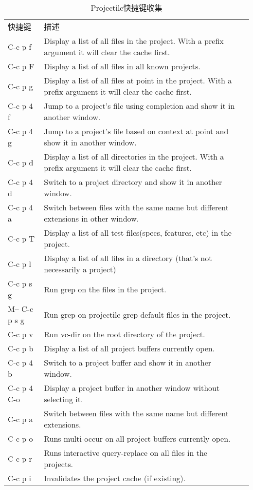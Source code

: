 \documentclass[10pt,a4paper]{article}
\begin{document}
\begin{longtable}{l|l|l}
\caption{Projectile快捷键收集}
\\
快捷键 & 描述\\
C-c p f & Display a list of all files in the project. With a prefix argument it will clear the cache first.\\
C-c p F & Display a list of all files in all known projects.\\
C-c p g & Display a list of all files at point in the project. With a prefix argument it will clear the cache first.\\
C-c p 4 f & Jump to a project's file using completion and show it in another window.\\
C-c p 4 g & Jump to a project's file based on context at point and show it in another window.\\
C-c p d & Display a list of all directories in the project. With a prefix argument it will clear the cache first.\\
C-c p 4 d & Switch to a project directory and show it in another window.\\
C-c p 4 a & Switch between files with the same name but different extensions in other window.\\
C-c p T & Display a list of all test files(specs, features, etc) in the project.\\
C-c p l & Display a list of all files in a directory (that's not necessarily a project)\\
C-c p s g & Run grep on the files in the project.\\
M-- C-c p s g & Run grep on projectile-grep-default-files in the project.\\
C-c p v & Run vc-dir on the root directory of the project.\\
C-c p b & Display a list of all project buffers currently open.\\
C-c p 4 b & Switch to a project buffer and show it in another window.\\
C-c p 4 C-o & Display a project buffer in another window without selecting it.\\
C-c p a & Switch between files with the same name but different extensions.\\
C-c p o & Runs multi-occur on all project buffers currently open.\\
C-c p r & Runs interactive query-replace on all files in the projects.\\
C-c p i & Invalidates the project cache (if existing).\\

\end{longtable}
\end{document}
